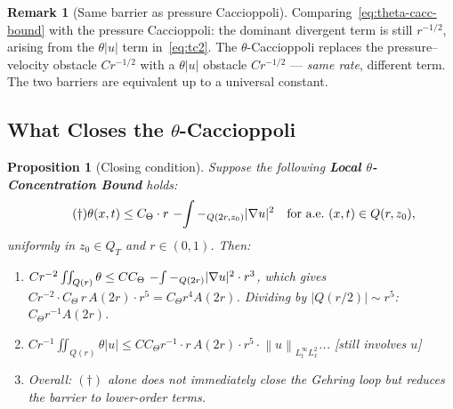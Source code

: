 \documentclass[11pt]{article}
\newtheorem{proposition}[theorem]{Proposition}
\theoremstyle{definition}
\newtheorem{remark}[theorem]{Remark}
\theoremstyle{remark}
\newcommand{\norm}[1]{\left\|#1\right\|}
\newcommand{\grad}{\nabla}
\newcommand{\Xint}{\mathop{\mathchoice{\vcenter{\hbox{$\displaystyle-$}}}%
  {\vcenter{\hbox{$\textstyle-$}}}%
  {\vcenter{\hbox{$\scriptstyle-$}}}%
  {\vcenter{\hbox{$\scriptscriptstyle-$}}}}\!\int}
\begin{document}
\begin{remark}[Same barrier as pressure Caccioppoli]
  Comparing~\eqref{eq:theta-cacc-bound} with the pressure Caccioppoli:
  the dominant divergent term is still $r^{-1/2}$, arising from the
  $\theta|u|$ term in~\eqref{eq:tc2}.  The $\theta$-Caccioppoli replaces
  the pressure--velocity obstacle $Cr^{-1/2}$ with a $\theta|u|$ obstacle
  $Cr^{-1/2}$ --- \emph{same rate}, different term.  The two barriers
  are equivalent up to a universal constant.
\end{remark}

\subsection{What Closes the $\theta$-Caccioppoli}

\begin{proposition}[Closing condition]\label{prop:theta-close}
  Suppose the following \textbf{Local $\theta$-Concentration Bound} holds:
  \begin{equation}\tag{$\dagger$}
    \theta(x,t)\leq C_\Theta\cdot r\,\Xint-_{Q(2r,z_0)}|\grad u|^2
    \quad\text{for a.e.\ }(x,t)\in Q(r,z_0),
  \end{equation}
  uniformly in $z_0\in Q_T$ and $r\in(0,1)$.  Then:
  \begin{enumerate}[label=(\roman*)]
  \item $Cr^{-2}\iint_{Q(r)}\theta\leq C C_\Theta\,\Xint-_{Q(2r)}|\grad u|^2\cdot r^3$,
    which gives $C r^{-2}\cdot C_\Theta\,r\,A(2r)\cdot r^5 = C_\Theta r^4 A(2r)$.
    Dividing by $|Q(r/2)|\sim r^5$: $C_\Theta r^{-1} A(2r)$.

  \item $Cr^{-1}\iint_{Q(r)}\theta|u|\leq C C_\Theta r^{-1}
    \cdot r\,A(2r)\cdot r^5 \cdot\norm{u}_{L^\infty_tL^2_x}$... \textit{[still involves $u$]}

  \item Overall: $(\dagger)$ alone does not immediately close the Gehring loop
    but reduces the barrier to lower-order terms.
  \end{enumerate}
\end{proposition}
\end{document}
